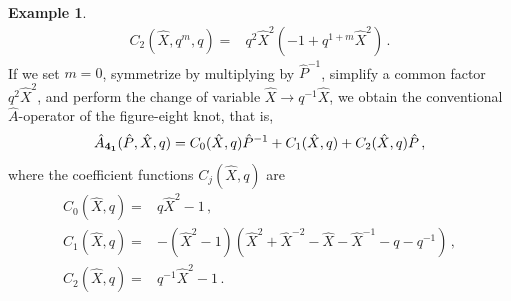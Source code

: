 \documentclass[a4paper,11pt]{article}
\theoremstyle{definition}
\newtheorem{example}[theorem]{Example}
\begin{document}
\begin{example}
\begin{subequations}
\begin{align}
      \label{rec41x2}
      C_2(\hat{X},q^m,q) =& q^2 \hat{X}^2 (-1 + q^{1 + m} \hat{X}^2) \, .
\end{align}
\end{subequations}
If we set $m=0$, symmetrize by multiplying by $\hat{P}^{-1}$, simplify a common factor $q^2 \hat{X}^2$, and perform the change of variable $\hat{X} \rightarrow q^{-1} \hat{X}$, we obtain the conventional 
$\hat A$-operator of the figure-eight knot, that is, 
%
\begin{equation}
    \label{41Ahat}
    \hat A_{\bf{4}_1} (\hat{P},\hat{X},q) = C_0(\hat{X},q) \hat{P}^{-1} + C_1(\hat{X},q) + C_2(\hat{X},q) \hat{P} \, ,
\end{equation}
%
where the coefficient functions $C_j(\hat{X},q)$ are 
%
\begin{subequations}
\begin{align}
      \label{41xC0}
      C_0(\hat{X},q) =&q \hat{X}^2-1 \, ,\\
      \label{41xC1}
      C_1(\hat{X},q) =& - (\hat{X}^2-1)( \hat{X}^2 + \hat{X}^{-2} - \hat{X} - \hat{X}^{-1} - q - q^{-1} ) \, ,\\ 
      \label{41xC2}
      C_2(\hat{X},q) =& q^{-1} \hat{X}^2-1 \, .
\end{align}
\end{subequations}
\end{example}
\end{document}
